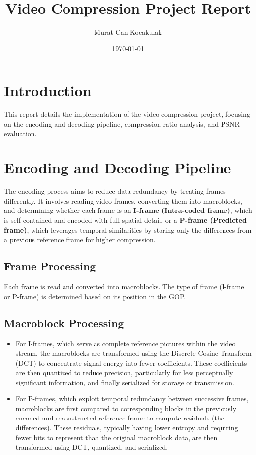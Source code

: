 \documentclass{article}
\title{Video Compression Project Report}
\author{Murat Can Kocakulak}
\date{\today}
\begin{document}
\maketitle

\section{Introduction}
This report details the implementation of the video compression project, focusing on the encoding and decoding pipeline, compression ratio analysis, and PSNR evaluation.

\section{Encoding and Decoding Pipeline}
The encoding process aims to reduce data redundancy by treating frames differently. It involves reading video frames, converting them into macroblocks, and determining whether each frame is an \textbf{I-frame (Intra-coded frame)}, which is self-contained and encoded with full spatial detail, or a \textbf{P-frame (Predicted frame)}, which leverages temporal similarities by storing only the differences from a previous reference frame for higher compression.

\subsection{Frame Processing}
Each frame is read and converted into macroblocks. The type of frame (I-frame or P-frame) is determined based on its position in the GOP.

\subsection{Macroblock Processing}
\begin{itemize}
    \item For I-frames, which serve as complete reference pictures within the video stream, the macroblocks are transformed using the Discrete Cosine Transform (DCT) to concentrate signal energy into fewer coefficients. These coefficients are then quantized to reduce precision, particularly for less perceptually significant information, and finally serialized for storage or transmission.
    \item For P-frames, which exploit temporal redundancy between successive frames, macroblocks are first compared to corresponding blocks in the previously encoded and reconstructed reference frame to compute residuals (the differences). These residuals, typically having lower entropy and requiring fewer bits to represent than the original macroblock data, are then transformed using DCT, quantized, and serialized.
\end{itemize}
\end{document}
